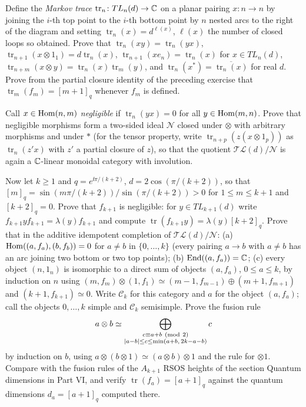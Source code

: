 \begin{exercise}
Define the \emph{Markov trace} $\operatorname{tr}_n\colon TL_n(d)\to\mathbb C$ on a planar pairing $x\colon n\to n$ by joining the $i$-th top point to the $i$-th bottom point by $n$ nested arcs to the right of the diagram and setting $\operatorname{tr}_n(x)=d^{\ell(x)}$, $\ell(x)$ the number of closed loops so obtained. Prove that $\operatorname{tr}_n(xy)=\operatorname{tr}_n(yx)$, $\operatorname{tr}_{n+1}(x\otimes1_1)=d\operatorname{tr}_n(x)$, $\operatorname{tr}_{n+1}(x e_n)=\operatorname{tr}_n(x)$ for $x\in TL_n(d)$, $\operatorname{tr}_{n+m}(x\otimes y)=\operatorname{tr}_n(x)\operatorname{tr}_m(y)$, and $\operatorname{tr}_n(x^*)=\overline{\operatorname{tr}_n(x)}$ for real $d$. Prove from the partial closure identity of the preceding exercise that $\operatorname{tr}_m(f_m)=[m+1]_q$ whenever $f_m$ is defined.

Call $x\in\operatorname{Hom}(n,m)$ \emph{negligible} if $\operatorname{tr}_n(yx)=0$ for all $y\in\operatorname{Hom}(m,n)$. Prove that negligible morphisms form a two-sided ideal $\mathcal N$ closed under $\otimes$ with arbitrary morphisms and under $*$ (for the tensor property, write $\operatorname{tr}_{n+p}(z(x\otimes1_p))$ as $\operatorname{tr}_n(z'x)$ with $z'$ a partial closure of $z$), so that the quotient $\mathcal{TL}(d)/\mathcal N$ is again a $\mathbb C$-linear monoidal category with involution.

Now let $k\ge1$ and $q=e^{\ii\pi/(k+2)}$, $d=2\cos(\pi/(k+2))$, so that $[m]_q=\sin(m\pi/(k+2))/\sin(\pi/(k+2))>0$ for $1\le m\le k+1$ and $[k+2]_q=0$. Prove that $f_{k+1}$ is negligible: for $y\in TL_{k+1}(d)$ write $f_{k+1}yf_{k+1}=\lambda(y)f_{k+1}$ and compute $\operatorname{tr}(f_{k+1}y)=\lambda(y)[k+2]_q$. Prove that in the additive idempotent completion of $\mathcal{TL}(d)/\mathcal N$: (a) $\operatorname{Hom}((a,f_a),(b,f_b))=0$ for $a\ne b$ in $\{0,\dots,k\}$ (every pairing $a\to b$ with $a\neq b$ has an arc joining two bottom or two top points); (b) $\operatorname{End}((a,f_a))=\mathbb C$; (c) every object $(n,1_n)$ is isomorphic to a direct sum of objects $(a,f_a)$, $0\le a\le k$, by induction on $n$ using $(m,f_m)\otimes(1,f_1)\simeq(m-1,f_{m-1})\oplus(m+1,f_{m+1})$ and $(k+1,f_{k+1})\simeq0$. Write $\mathcal C_k$ for this category and $a$ for the object $(a,f_a)$; call the objects $0,\dots,k$ simple and $\mathcal C_k$ semisimple. Prove the fusion rule
\[
a\otimes b\simeq\bigoplus_{\substack{c\equiv a+b\ (\mathrm{mod}\ 2)\\ \left\lvert a-b\right\rvert\le c\le\min(a+b,\,2k-a-b)}}c
\]
by induction on $b$, using $a\otimes(b\otimes1)\simeq(a\otimes b)\otimes 1$ and the rule for $\otimes1$. Compare with the fusion rules of the $A_{k+1}$ RSOS heights of the section Quantum dimensions in Part VI, and verify $\operatorname{tr}(f_a)=[a+1]_q$ against the quantum dimensions $d_a=[a+1]_q$ computed there.
\end{exercise}

